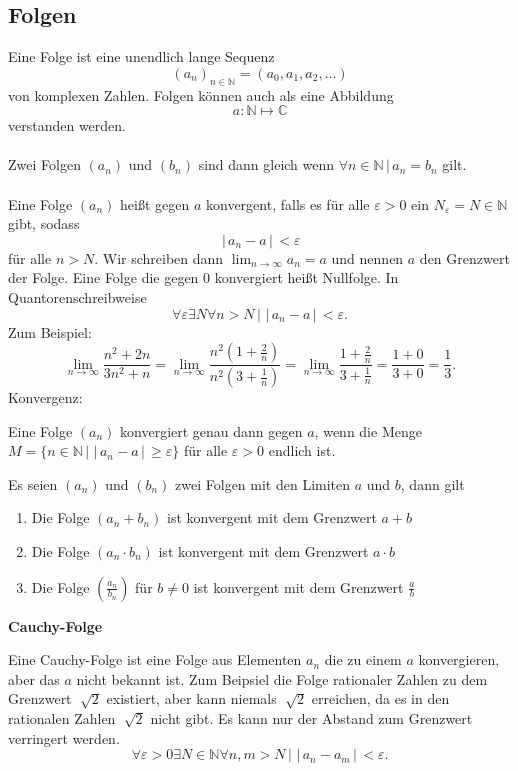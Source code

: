 \documentclass[a4paper,12pt]{article}
\begin{document}
\subsection{Folgen}
Eine Folge ist eine unendlich lange Sequenz
\[ 
        \left(a_n\right)_{n  \in \mathbb{N}}=\left(a_0,a_1,a_2,\hdots\right)
\] 
von komplexen Zahlen. Folgen können auch als eine Abbildung 
\[
        a:\mathbb{N}\mapsto\mathbb{C}
\]
verstanden werden.\\\\
Zwei Folgen $\left(a_n\right)$ und $\left(b_n\right)$ sind dann gleich wenn $\forall n  \in \mathbb{N}\,|\, a_n=b_n$ gilt.\\\\
Eine Folge $\left(a_n\right)$ heißt gegen $a$ konvergent, falls es für alle $\varepsilon>0$ ein $N_{\varepsilon} =N  \in \mathbb{N}$ gibt, sodass
\[ 
        \,|\, a_n-a\,|\, <\varepsilon
\] 
für alle $n>N$. Wir schreiben dann $\lim_{n\rightarrow \infty}a_n=a$ und nennen $a$ den Grenzwert der Folge. Eine Folge die gegen $0$ konvergiert heißt Nullfolge. In Quantorenschreibweise
\[ 
        \forall \varepsilon \exists N \forall n>N\,|\, \,|\, a_n-a\,|\, <\varepsilon
.\]
Zum Beispiel:
\[ 
        \lim_{n\rightarrow \infty}\dfrac{n^2+2n}{3n^2+n}=\lim_{n\rightarrow \infty}\dfrac{n^2\left(1+\tfrac{2}{n}\right)}{n^2\left(3+\tfrac{1}{n}\right)}=\lim_{n\rightarrow \infty}\dfrac{1+\tfrac{2}{n}}{3+\tfrac{1}{n}}=\dfrac{1+0}{3+0}=\dfrac{1}{3}
.\] 
Konvergenz:
\begin{center}
        Eine Folge $\left(a_n\right)$ konvergiert genau dann gegen $a$, wenn die Menge\\ $M=\{n  \in \mathbb{N}\,|\, \,|\, a_n-a\,|\, \geq \varepsilon \}$ für alle $\varepsilon >0$ endlich ist.
\end{center}
Es seien $\left(a_n\right)$ und $\left(b_n\right)$ zwei Folgen mit den Limiten $a$ und $b$, dann gilt
\begin{enumerate}[label=]
        \item Die Folge $\left(a_n+b_n\right)$ ist konvergent mit dem Grenzwert $a+b$ 
        \item Die Folge $\left(a_n\cdot b_n\right)$ ist konvergent mit dem Grenzwert $a\cdot b$ 
        \item Die Folge $\left(\tfrac{a_n}{b_n}\right)$ für $b\neq 0$ ist konvergent mit dem Grenzwert $\tfrac{a}{b}$ 
\end{enumerate}
\textbf{Cauchy-Folge}
\begin{center}
Eine Cauchy-Folge ist eine Folge aus Elementen $a_n$ die zu einem $a$ konvergieren, aber das $a$ nicht bekannt ist. Zum Beipsiel die Folge rationaler Zahlen zu dem Grenzwert $\sqrt[]{2}$ existiert, aber kann niemals $\sqrt[]{2}$ erreichen, da es in den rationalen Zahlen $\sqrt[]{2}$ nicht gibt. Es kann nur der Abstand zum Grenzwert verringert werden.
\[ 
        \forall \varepsilon >0\exists N \in \mathbb{N}\forall n,m>N\,|\, \,|\, a_n-a_m\,|\, <\varepsilon 
.\] 
\end{center}
\end{document}
